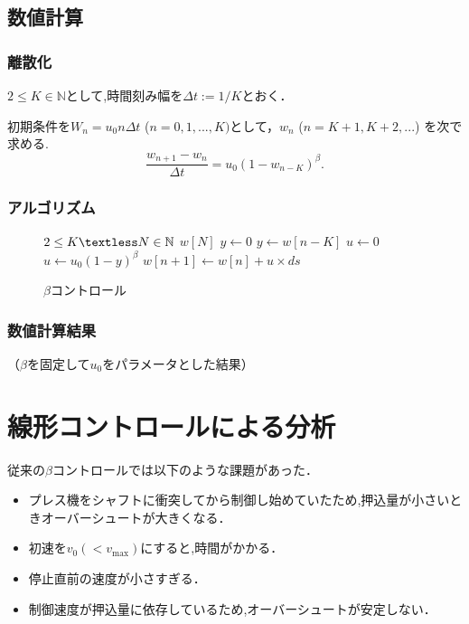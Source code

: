 \documentclass [dvipdfmx] {jsarticle}
\numberwithin{equation}{section}
\theoremstyle{definition} %
\theoremstyle{definition} %
\begin{document}
\subsection{数値計算}
\subsubsection{離散化}
$2\le K\in\mathbb{N}$として,時間刻み幅を$\Delta t:=1/K$とおく．

初期条件を$W_n=u_0n\Delta t$ ($n=0,1,...,K)$として，$w_n $ ($n=K+1,K+2,...$)
を次で求める.
\begin{equation}
    \displaystyle\frac{w_{n+1}-w_n}{\Delta t}=u_0(1-w_{n-K})^\beta.
\end{equation}
\subsubsection{アルゴリズム}
\begin{figure}[h]
    \begin{algorithm}[H]
        \caption{$\beta$コントロール}
        \label{alg1}
        \begin{algorithmic}[1]    
        \REQUIRE $2\le K \textless N\in\mathbb{N}$
        \ENSURE $w[N]$
        \STATE $y \leftarrow 0$
        \ELSE
        \STATE $y \leftarrow w[n-K]$
        \ENDIF
        \STATE $u \leftarrow 0$
        \ELSE
        \STATE $u \leftarrow u_0(1-y)^\beta$
        \ENDIF
        \STATE $w[n+1]\leftarrow w[n]+u\times ds$
        \ENDFOR
        \end{algorithmic}
    \end{algorithm}
\end{figure}
\subsubsection{数値計算結果}
（$\beta$を固定して$u_0$をパラメータとした結果）
\section{線形コントロールによる分析}
従来の$\beta$コントロールでは以下のような課題があった．
\begin{itemize}
    \item プレス機をシャフトに衝突してから制御し始めていたため,押込量が小さいときオーバーシュートが大きくなる．
    \item 初速を$v_0(<v_{\max})$にすると,時間がかかる．
    \item 停止直前の速度が小さすぎる．
    \item 制御速度が押込量に依存しているため,オーバーシュートが安定しない．
\end{itemize}
\end{document}
